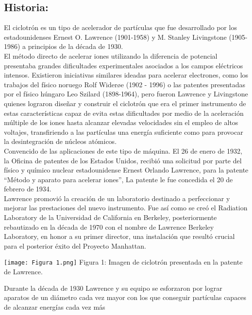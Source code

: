 \documentclass[12pt]{article}
\begin{document}
			\subsection{Historia:}\label{subsec:Historia:}
				El ciclotrón es un tipo de acelerador de partículas que fue desarrollado por los estadounidenses 
				Ernest O. Lawrence (1901-1958) y M. Stanley Livingstone (1905-1986) a principios de la década de 
				1930. \\
				El método directo de acelerar iones utilizando la diferencia de potencial presentaba grandes 
				dificultades experimentales asociados a los campos eléctricos intensos. Existieron iniciativas 
				similares ideadas para acelerar electrones, como los trabajos del físico noruego Rolf Widerøe 
				(1902 - 1996) o las patentes presentadas por el físico húngaro Leo Szilard (1898-1964), pero fueron 
				Lawrence y Livingstone quienes lograron diseñar y construir el ciclotrón que era el primer 
				instrumento de estas características capaz de evita estas dificultades por medio de la aceleración 
				múltiple de los iones hasta alcanzar elevadas velocidades sin el empleo de altos voltajes, 
				transfiriendo a las partículas una energía suficiente como para provocar la desintegración de 
				núcleos atómicos. \\
				Convencido de las aplicaciones de este tipo de máquina. El 26 de enero de 1932, la Oficina de 
				patentes de los Estados Unidos, recibió una solicitud por parte del físico y químico nuclear 
				estadounidense Ernest Orlando Lawrence, para la patente “Método y aparato para acelerar 
				iones”, La patente le fue concedida el 20 de febrero de 1934. \\
				Lawrence promovió la creación de un laboratorio destinado a perfeccionar y mejorar las 
				prestaciones del nuevo instrumento. Fue así como se creó el Radiation Laboratory de la 
				Universidad de California en Berkeley, posteriormente rebautizado en la década de 1970 con el 
				nombre de Lawrence Berkeley Laboratory, en honor a su primer director, una instalación que 
				resultó crucial para el posterior éxito del Proyecto Manhattan.
				\begin{center}
					\texttt{[image: Figura 1.png]}
					Figura 1: Imagen de ciclotrón presentada en la patente de Lawrence. \cite{bib:item1}
				\end{center}
				Durante la década de 1930 Lawrence y su equipo se esforzaron por lograr aparatos de un diámetro 
				cada vez mayor con los que conseguir partículas capaces de alcanzar energías cada vez más 
\end{document}
